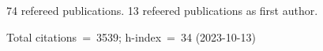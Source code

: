 74 refereed publications. 13 refeered publications as first author.

Total citations~=~3539; h-index~=~34 (2023-10-13)